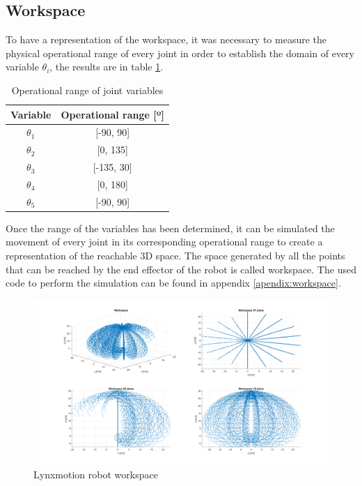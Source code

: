 \documentclass{article}
\begin{document}
\subsection{Workspace}
To have a representation of the workspace, it was necessary to measure the physical operational range of every joint in order to establish the domain of every variable $\theta_i$, the results are in table \ref{tab:workspace.range}.

\begin{table}[h!]
\centering
\begin{tabular}{ c | c }
Variable		& Operational range [º]\\ \hline
$\theta_1$	& [-90, 90]\\
$\theta_2$	& [0, 135]\\
$\theta_3$	& [-135, 30]\\
$\theta_4$	& [0, 180]\\
$\theta_5$	& [-90, 90]
\end{tabular}
\caption{Operational range of joint variables}
\label{tab:workspace.range}
\end{table}

Once the range of the variables has been determined, it can be simulated the movement of every joint in its corresponding operational range to create a representation of the reachable 3D space. The space generated by all the points that can be reached by the end effector of the robot is called workspace. The used code to perform the simulation can be found in appendix \ref{apendix:workspace}.

\begin{figure}
\begin{center}
\includegraphics[width=\textwidth]{images/Workspace}
\caption{Lynxmotion robot workspace}
\label{fig:workpace.workspace}
\end{center}
\end{figure}
\end{document}
